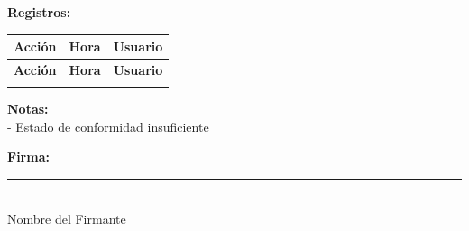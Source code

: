 \documentclass[a4paper,10pt]{article}
\begin{document}
\vspace{1.5em}

\noindent \textbf{Registros:} \\
\begin{longtable}{|p{}|p{}|p{}|}
    \hline
    \textbf{Acción} & \textbf{Hora} & \textbf{Usuario} \\
    \hline
    \endfirsthead
    \hline
    \textbf{Acción} & \textbf{Hora} & \textbf{Usuario} \\
    \hline
    \endhead
    \hline
    \endfoot

\end{longtable}

\vspace{1.5em}

\noindent \textbf{Notas:} \\ - Estado de conformidad insuficiente \\

\vspace{4em}

\noindent \textbf{Firma:} \\
\rule{5cm}{0.4pt} \\ %
Nombre del Firmante \\
\end{document}
